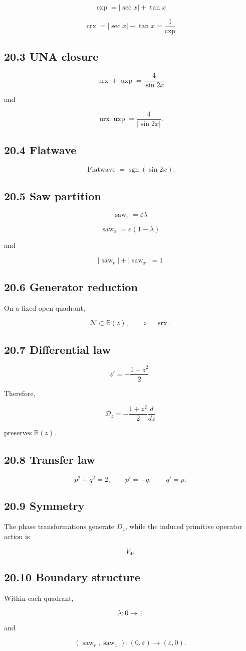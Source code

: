 \documentclass[11pt,oneside,openany]{book}
\newcommand{\PCsubsection}[1]{%
  \subsection*{#1}%
}
\begin{document}
\[
\boxed{\operatorname{cxp}=|\sec x|+\tan x}
\]

\[
\boxed{\operatorname{crx}=|\sec x|-\tan x=\frac1{\operatorname{cxp}}}
\]


\PCsubsection{20.3 UNA closure}

\[
\boxed{ \operatorname{urx} + \operatorname{uxp} = \frac4{\sin 2x} }
\]

and

\[
\boxed{ \operatorname{urx}\operatorname{uxp} = \frac4{|\sin 2x|}. }
\]

\PCsubsection{20.4 Flatwave}

\[
\boxed{ \operatorname{Flatwave} = \operatorname{sgn}(\sin 2x). }
\]

\PCsubsection{20.5 Saw partition}

\[
\boxed{ \operatorname{saw}_{r}=\varepsilon\lambda }
\]

\[
\boxed{ \operatorname{saw}_{x}=\varepsilon(1-\lambda) }
\]

and

\[
\boxed{ |\operatorname{saw}_{r}|+|\operatorname{saw}_{x}|=1 }
\]


\PCsubsection{20.6 Generator reduction}

On a fixed open quadrant,

\[
\boxed{ \mathcal N\subset\mathbb R(z), \qquad z=\operatorname{srx}. }
\]

\PCsubsection{20.7 Differential law}

\[
\boxed{ z' = -\frac{1+z^2}{2}. }
\]

Therefore,

\[
\boxed{ \mathcal D_z = -\frac{1+z^2}{2}\frac{d}{dz} }
\]

preserves \(\mathbb R(z)\).

\PCsubsection{20.8 Transfer law}

\[
\boxed{ p^2+q^2=2, \qquad p'=-q, \qquad q'=p. }
\]

\PCsubsection{20.9 Symmetry}

The phase transformations generate \(D_4\), while the induced primitive operator action is

\[
\boxed{ V_4. }
\]

\PCsubsection{20.10 Boundary structure}

Within each quadrant,

\[
\boxed{ \lambda:0\to1 }
\]

and

\[
\boxed{ (\operatorname{saw}_{r},\operatorname{saw}_{x}) : (0,\varepsilon)\to(\varepsilon,0). }
\]
\end{document}
